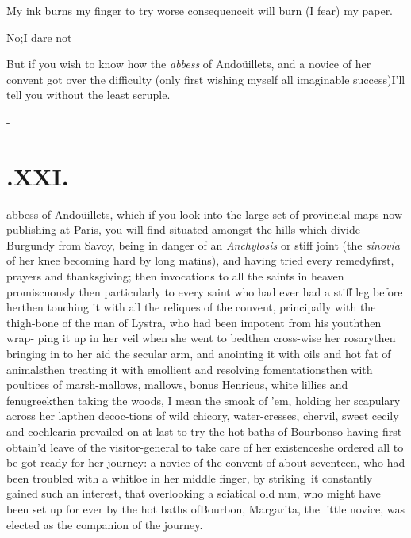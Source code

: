 \documentclass{article}
\begin{document}
\tsh My ink burns my finger to try\break
{}
worse consequence\tsh it will burn (I fear) my paper.

\tsh No;\tsh I dare not\tsh

But if you wish to know how the \textit{ab\-bess} of
Andoüillets, and a novice of her convent got over the
difficulty (only first wishing myself all imaginable
success)\tsk I’ll tell you without the least scruple.

\vfill{}\eject
\null\kern-\baselineskip
\section{.\enspace XXI.}

 abbess of Andoüillets, which if you look into
the large set of provincial maps now publishing at Paris, you
will find situated amongst the hills which divide Burgundy from
Savoy, being in danger of an \textit{Anchylosis} or stiff\break
joint (the \textit{sinovia} of her knee becoming\break
hard by long matins), and having tried\break
every remedy\tsh first, prayers and\break
thanksgiving; then invocations to all\break
the saints in heaven promiscuously\tsh\break
then particularly to every saint who had\break
ever had a stiff leg before her\tsh then\break
touching it with all the reliques of the\break
convent, principally with the thigh-bone\break
of the man of Lystra, who had been\break
impotent from his youth\tsh then wrap-
ping it up in her veil when she went to
bed\tsk then cross-wise her rosary\tsk then bringing in to her
aid the secular arm, and anointing it with oils and hot fat of
animals\tsh then treating it with emollient and resolving
fomentations\tsh then with poultices of marsh-mallows, mallows,
bonus Henricus, white lillies and fenugreek\tsk then taking the
woods, I mean the smoak of ’em, holding her scapulary across her
lap\tsh then decoc-\break tions of wild chicory, water-cresses, chervil,
sweet cecily and cochlearia\tsh {} prevailed on at last to try the hot baths
of Bourbon\tsh so having first obtain’d leave of the
visitor-general to take care of her existence\tsk she ordered
all to be got ready for her journey: a novice of the
convent of about seventeen, who had been troubled with a whitloe
in her\break
middle finger, by striking\sic\ it constantly\break
{}
gained such an interest, that overlooking a sciatical old nun, who might have been set up
for ever by the hot baths of\break Bourbon, Margarita, the
little novice, was elected as the companion of the\break
journey.
\end{document}
